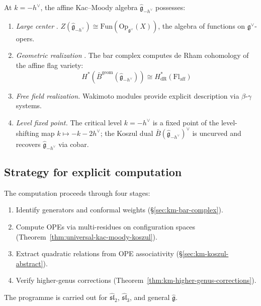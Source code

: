 \begin{theorem}\label{thm:critical-level-structure}
At $k = -h^\vee$, the affine Kac--Moody algebra $\widehat{\mathfrak{g}}_{-h^\vee}$ possesses:
\begin{enumerate}
\item \emph{Large center} \cite{Feigin-Frenkel}. $Z(\widehat{\mathfrak{g}}_{-h^\vee}) \cong \mathrm{Fun}(\mathrm{Op}_{\mathfrak{g}^\vee}(X))$, the algebra of functions on $\mathfrak{g}^\vee$-opers.
\item \emph{Geometric realization} \cite{Feigin-Frenkel}. The bar complex computes de Rham cohomology of the affine flag variety:
\begin{equation}
H^*(\bar{B}^{\mathrm{geom}}(\widehat{\mathfrak{g}}_{-h^\vee})) \cong H^*_{\mathrm{dR}}(\mathrm{Fl}_{\mathrm{aff}})
\end{equation}
\item \emph{Free field realization.} Wakimoto modules provide explicit description via $\beta$-$\gamma$ systems.
\item \emph{Level fixed point.} The critical level $k = -h^\vee$ is a fixed point of the level-shifting map $k \mapsto -k-2h^\vee$; the Koszul dual $\bar{B}(\widehat{\mathfrak{g}}_{-h^\vee})^\vee$ is uncurved and recovers $\widehat{\mathfrak{g}}_{-h^\vee}$ via cobar.
\end{enumerate}
\end{theorem}

\subsection{Strategy for explicit computation}

\begin{remark}[Strategy]
The computation proceeds through four stages:
\begin{enumerate}[label=(\roman*)]
\item Identify generators and conformal weights (\S\ref{sec:km-bar-complex}).
\item Compute OPEs via multi-residues on configuration spaces
  (Theorem~\ref{thm:universal-kac-moody-koszul}).
\item Extract quadratic relations from OPE associativity
  (\S\ref{sec:km-koszul-abstract}).
\item Verify higher-genus corrections
  (Theorem~\ref{thm:km-higher-genus-corrections}).
\end{enumerate}
The programme is carried out for $\widehat{\mathfrak{sl}}_2$,
$\widehat{\mathfrak{sl}}_3$, and general $\widehat{\mathfrak{g}}$.
\end{remark}


